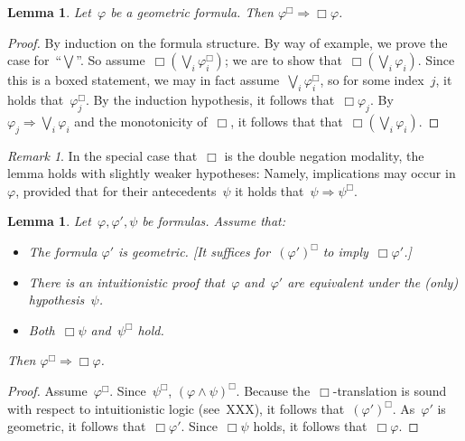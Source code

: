 \documentclass[10pt]{amsart}
\theoremstyle{definition}
\newtheorem{ex}[defn]{Example}
\theoremstyle{plain}
\newtheorem{lemma}[defn]{Lemma}
\theoremstyle{remark}
\newtheorem{rem}[defn]{Remark}
\newcommand{\Sh}{\mathrm{Sh}}
\newcommand{\?}{\,{:}\,}
\renewcommand{\_}{\mathpunct{.}\,}
\begin{document}
\begin{lemma}\label{lemma:stalk-open}
Let~$\varphi$ be a geometric formula.
Then $\varphi^\Box \Rightarrow \Box\varphi$.\end{lemma}
\begin{proof}By induction on the formula structure. By way of example, we prove
the case for~``$\bigvee$''. So assume~$\Box(\bigvee_i \varphi_i^\Box)$; we are
to show that~$\Box(\bigvee_i \varphi_i)$. Since this is a boxed statement, we
may in fact assume~$\bigvee_i \varphi_i^\Box$, so for some index~$j$, it holds
that~$\varphi_j^\Box$. By the induction hypothesis, it follows
that~$\Box\varphi_j$. By~$\varphi_j \Rightarrow \bigvee_i \varphi_i$ and the
monotonicity of~$\Box$, it follows that that~$\Box(\bigvee_i \varphi_i)$.
\end{proof}


\begin{rem}In the special case that~$\Box$ is the double negation modality, the
lemma holds with slightly weaker hypotheses: Namely, implications may occur
in~$\varphi$, provided that for their antecedents~$\psi$ it holds that~$\psi
\Rightarrow \psi^\Box$.\end{rem}

\begin{lemma}\label{lemma:stalk-open-with-hypothesis}
Let~$\varphi, \varphi', \psi$ be formulas. Assume that:
\begin{itemize}
\item The formula $\varphi'$ is geometric. [It suffices for~$(\varphi')^\Box$
to imply~$\Box\varphi'$.]
\item There is an intuitionistic proof that~$\varphi$
and~$\varphi'$ are equivalent under the (only) hypothesis~$\psi$.
\item Both~$\Box\psi$ and~$\psi^\Box$ hold.
\end{itemize}
Then $\varphi^\Box \Rightarrow \Box\varphi$.
\end{lemma}
\begin{proof}
Assume~$\varphi^\Box$. Since~$\psi^\Box$, $(\varphi \wedge \psi)^\Box$. Because
the~$\Box$-translation is sound with respect to intuitionistic logic (see~XXX),
it follows that~$(\varphi')^\Box$. As~$\varphi'$ is geometric, it follows
that~$\Box\varphi'$. Since~$\Box\psi$ holds, it follows that~$\Box\varphi$.
\end{proof}
\end{document}
